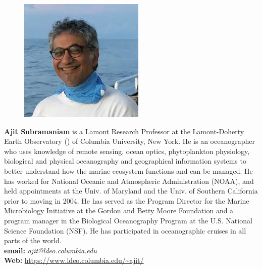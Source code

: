 \documentclass[12pt]{article}
\begin{document}
\parbox{6.5in}{
\begin{figure}
 \centering
  \includegraphics[width=.75\linewidth]{fig/ASub.jpg}
\end{figure}

\textbf{Ajit Subramaniam} is a Lamont Research Professor at the
Lamont-Doherty Earth Observatory (\ldeoe) of Columbia University, New
York.  He is an oceanographer who uses knowledge of remote sensing,
ocean optics, phytoplankton physiology, biological and physical
oceanography and geographical information systems to better understand
how the marine ecosystem functions and can be managed.  He has worked
for National Oceanic and Atmospheric Administration (NOAA), and held
appointments at the Univ. of Maryland and the Univ. of Southern
California prior to moving \ldeo in 2004. He has served as the Program
Director for the Marine Microbiology Initiative at the Gordon and
Betty Moore Foundation and a program manager in the Biological
Oceanography Program at the U.S. National Science Foundation (NSF). He
has participated in oceanographic cruises in all parts of the world.
\\
\textbf{email: }\emph{ajit@ldeo.columbia.edu} \\
\textbf{Web: }\url{https://www.ldeo.columbia.edu/~ajit/}
}
\end{document}
